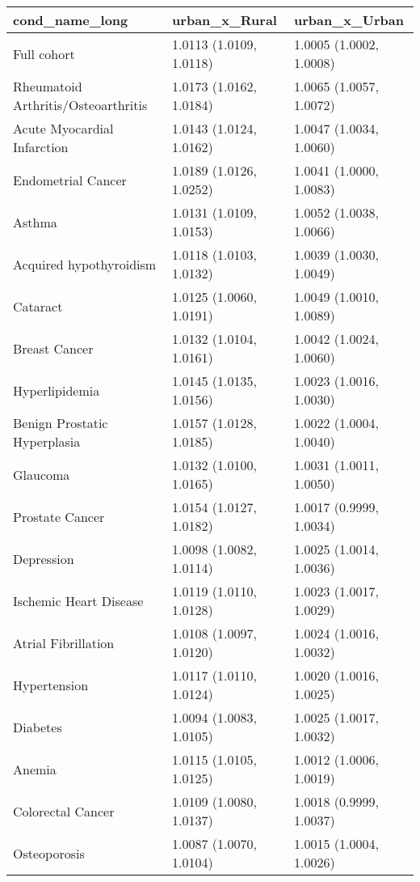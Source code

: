 \begin{table}[ht]
\centering
\begin{tabular}{lll}
  \hline
cond_name_long & urban_x_Rural & urban_x_Urban \\ 
  \hline
Full cohort & 1.0113 (1.0109, 1.0118) & 1.0005 (1.0002, 1.0008) \\ 
  Rheumatoid Arthritis/Osteoarthritis & 1.0173 (1.0162, 1.0184) & 1.0065 (1.0057, 1.0072) \\ 
  Acute Myocardial Infarction & 1.0143 (1.0124, 1.0162) & 1.0047 (1.0034, 1.0060) \\ 
  Endometrial Cancer & 1.0189 (1.0126, 1.0252) & 1.0041 (1.0000, 1.0083) \\ 
  Asthma & 1.0131 (1.0109, 1.0153) & 1.0052 (1.0038, 1.0066) \\ 
  Acquired hypothyroidism & 1.0118 (1.0103, 1.0132) & 1.0039 (1.0030, 1.0049) \\ 
  Cataract & 1.0125 (1.0060, 1.0191) & 1.0049 (1.0010, 1.0089) \\ 
  Breast Cancer & 1.0132 (1.0104, 1.0161) & 1.0042 (1.0024, 1.0060) \\ 
  Hyperlipidemia & 1.0145 (1.0135, 1.0156) & 1.0023 (1.0016, 1.0030) \\ 
  Benign Prostatic Hyperplasia & 1.0157 (1.0128, 1.0185) & 1.0022 (1.0004, 1.0040) \\ 
  Glaucoma & 1.0132 (1.0100, 1.0165) & 1.0031 (1.0011, 1.0050) \\ 
  Prostate Cancer & 1.0154 (1.0127, 1.0182) & 1.0017 (0.9999, 1.0034) \\ 
  Depression & 1.0098 (1.0082, 1.0114) & 1.0025 (1.0014, 1.0036) \\ 
  Ischemic Heart Disease & 1.0119 (1.0110, 1.0128) & 1.0023 (1.0017, 1.0029) \\ 
  Atrial Fibrillation & 1.0108 (1.0097, 1.0120) & 1.0024 (1.0016, 1.0032) \\ 
  Hypertension & 1.0117 (1.0110, 1.0124) & 1.0020 (1.0016, 1.0025) \\ 
  Diabetes & 1.0094 (1.0083, 1.0105) & 1.0025 (1.0017, 1.0032) \\ 
  Anemia & 1.0115 (1.0105, 1.0125) & 1.0012 (1.0006, 1.0019) \\ 
  Colorectal Cancer & 1.0109 (1.0080, 1.0137) & 1.0018 (0.9999, 1.0037) \\ 
  Osteoporosis & 1.0087 (1.0070, 1.0104) & 1.0015 (1.0004, 1.0026) \\ 

\end{tabular}
\end{table}
